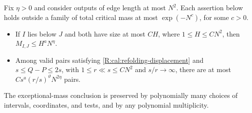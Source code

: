 \begin{lemma}\label{R:cal:refolding-labels}
Fix $\eta>0$ and consider outputs of edge length at most $N^2$.
Each assertion below holds outside a family of total critical mass at
most $\exp(-N^c)$, for some $c>0$.
\begin{itemize}
\item If $I$ lies below $J$ and both have size at most $CH$, where
$1\le H\le CN^2$, then $M_{I,J}\le H^aN^\eta$.
\item Among valid pairs satisfying
\eqref{R:cal:refolding-displacement} and $s\le Q-P\le2s$, with
$1\le r\ll s\le CN^2$ and $s/r\to\infty$, there are at most
$Cs^a(r/s)^\vartheta N^{2\eta}$ pairs.
\end{itemize}
The exceptional-mass conclusion is preserved by polynomially many
choices of intervals, coordinates, and tests, and by any polynomial
multiplicity.
\end{lemma}
